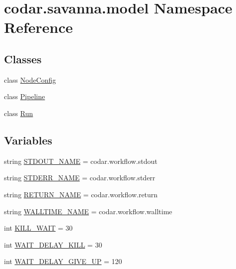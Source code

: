 \hypertarget{namespacecodar_1_1savanna_1_1model}{}\section{codar.\+savanna.\+model Namespace Reference}
\label{namespacecodar_1_1savanna_1_1model}
\subsection*{Classes}
\begin{DoxyCompactItemize}
\item 
class \hyperlink{classcodar_1_1savanna_1_1model_1_1_node_config}{Node\+Config}
\item 
class \hyperlink{classcodar_1_1savanna_1_1model_1_1_pipeline}{Pipeline}
\item 
class \hyperlink{classcodar_1_1savanna_1_1model_1_1_run}{Run}
\end{DoxyCompactItemize}
\subsection*{Variables}
\begin{DoxyCompactItemize}
\item 
string \hyperlink{namespacecodar_1_1savanna_1_1model_a0d566ad370f638d17d805dce32b4bbce}{S\+T\+D\+O\+U\+T\+\_\+\+N\+A\+ME} = \textquotesingle{}codar.\+workflow.\+stdout\textquotesingle{}
\item 
string \hyperlink{namespacecodar_1_1savanna_1_1model_a979eae72abc6932f745c4d4c300f06e7}{S\+T\+D\+E\+R\+R\+\_\+\+N\+A\+ME} = \textquotesingle{}codar.\+workflow.\+stderr\textquotesingle{}
\item 
string \hyperlink{namespacecodar_1_1savanna_1_1model_a375dfbe6e7e59d827254d61f41c881f7}{R\+E\+T\+U\+R\+N\+\_\+\+N\+A\+ME} = \textquotesingle{}codar.\+workflow.\+return\textquotesingle{}
\item 
string \hyperlink{namespacecodar_1_1savanna_1_1model_a24dd8e3ab8d3d0fd004bcd54ce016fbc}{W\+A\+L\+L\+T\+I\+M\+E\+\_\+\+N\+A\+ME} = \textquotesingle{}codar.\+workflow.\+walltime\textquotesingle{}
\item 
int \hyperlink{namespacecodar_1_1savanna_1_1model_a5c2add528fd0ef347e5ff8deb12e9ada}{K\+I\+L\+L\+\_\+\+W\+A\+IT} = 30
\item 
int \hyperlink{namespacecodar_1_1savanna_1_1model_acf527a4d78021abd552f51e81830a7d4}{W\+A\+I\+T\+\_\+\+D\+E\+L\+A\+Y\+\_\+\+K\+I\+LL} = 30
\item 
int \hyperlink{namespacecodar_1_1savanna_1_1model_a131cd01c29206f90bc9505d9b50f1ff6}{W\+A\+I\+T\+\_\+\+D\+E\+L\+A\+Y\+\_\+\+G\+I\+V\+E\+\_\+\+UP} = 120
\end{DoxyCompactItemize}


